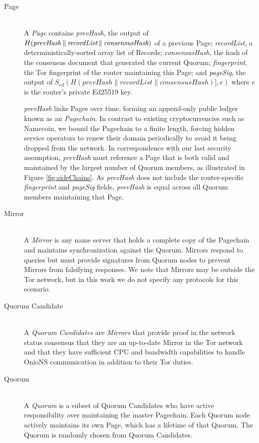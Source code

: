 \documentclass{sig-alternate}
\newcommand*\concat{\mathbin{\|}}
\begin{document}
\begin{description}
	\item[Page] \hfill \\
		A \emph{Page} contains \emph{prevHash}, the output of $ H(\emph{prevHash} \concat \emph{recordList} \concat \emph{consensusHash}) $ of a previous Page; \emph{recordList}, a deterministically-sorted array list of Records; \emph{consensusHash}, the hash of the consensus document that generated the current Quorum; \emph{fingerprint}, the Tor fingerprint of the router maintaining this Page; and \emph{pageSig}, the output of $ S_{\mathit{ed}}(H(\mathit{prevHash} \concat \mathit{recordList} \concat \mathit{consensusHash})], e) $ where $ e $ is the router's private Ed25519 key.
		
		\emph{prevHash} links Pages over time, forming an append-only public ledger known as an \emph{Pagechain}. In contrast to existing cryptocurrencies such as Namecoin, we bound the Pagechain to a finite length, forcing hidden service operators to renew their domain periodically to avoid it being dropped from the network. In correspondence with our last security assumption, \emph{prevHash} must reference a Page that is both valid and maintained by the largest number of Quorum members, as illustrated in Figure \ref{fig:sideChains}. As \emph{prevHash} does not include the router-specific \emph{fingerprint} and \emph{pageSig} fields, \emph{prevHash} is equal across all Quorum members maintaining that Page.

	\item[Mirror] \hfill \\
		A \emph{Mirror} is any name server that holds a complete copy of the Pagechain and maintains synchronization against the Quorum. Mirrors respond to queries but must provide signatures from Quorum nodes to prevent Mirrors from falsifying responses. We note that Mirrors may be outside the Tor network, but in this work we do not specify any protocols for this scenario.

	\item[Quorum Candidate] \hfill \\
		A \emph{Quorum Candidates} are \emph{Mirrors} that provide proof in the network status consensus that they are an up-to-date Mirror in the Tor network and that they have sufficient CPU and bandwidth capabilities to handle OnioNS communication in addition to their Tor duties.

	\item[Quorum] \hfill \\
		A \emph{Quorum} is a subset of Quorum Candidates who have active responsibility over maintaining the master Pagechain. Each Quorum node actively maintains its own Page, which has a lifetime of that Quorum. The Quorum is randomly chosen from Quorum Candidates.
\end{description}
\end{document}
